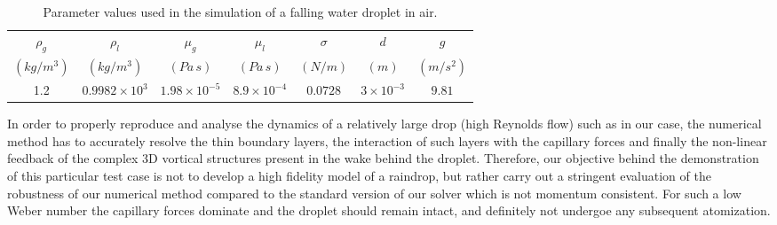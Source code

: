\begin{table}[h!]
\begin{center}
\begin{tabular}{ccccccc}
\hline\hline
$\rho_{g}$ & $\rho_{l}$ & $\mu_{g}$ 
& $\mu_{l}$ & $\sigma$ & $d$ & $g$\\
$\left(kg/m^3\right)$ & $\left(kg/m^3\right)$ & $\left(Pa \, s\right)$ 
& $\left(Pa \,s \right)$ & $\left(N/m\right)$ & $(m)$ & $(m /s^{2})$ \\
\hline
1.2 & $0.9982 \times 10^3$ & $1.98 \times 10^{-5}$ & 
$8.9 \times 10^{-4}$ & $0.0728$ & $3 \times 10^{-3}$ & $9.81$\\
\hline\hline
\end{tabular}
\caption{Parameter values used in the simulation of a falling water droplet in air. 
\label{raindropprop}}
\end{center}
\end{table}

In order to properly reproduce and analyse the dynamics of a relatively large drop (high Reynolds flow) such as in our case, the numerical method has to accurately resolve the thin boundary layers, the interaction of such layers with the capillary forces and finally the non-linear feedback of the complex 3D vortical structures present in the wake behind the droplet. Therefore, our objective behind the demonstration of this particular test case is not to develop a high fidelity model of a raindrop, but rather carry out a stringent evaluation of the robustness of our numerical method compared to the standard version of our solver which is not momentum consistent. For such a low Weber number the capillary forces dominate and the droplet should remain intact, and definitely not undergoe any subsequent atomization. 


